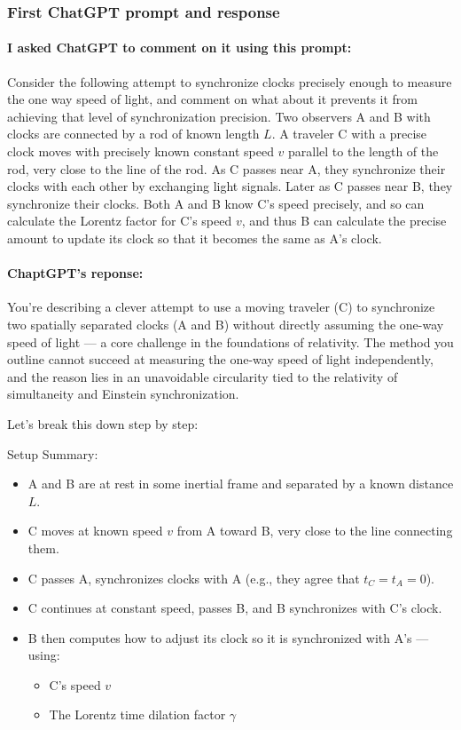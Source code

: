 \documentclass[a4paper]{article}
\theoremstyle{plain}
\theoremstyle{definition}
\begin{document}
\subsubsection{First ChatGPT prompt and response}

\paragraph{I asked ChatGPT to comment on it using this prompt:}

Consider the following attempt to synchronize clocks precisely enough
to measure the one way speed of light, and comment on what about it
prevents it from achieving that level of synchronization precision.
Two observers A and B with clocks are connected by a rod of known
length $L$.  A traveler C with a precise clock moves with precisely
known constant speed $v$ parallel to the length of the rod, very close
to the line of the rod.  As C passes near A, they synchronize their
clocks with each other by exchanging light signals.  Later as C passes
near B, they synchronize their clocks.  Both A and B know C's speed
precisely, and so can calculate the Lorentz factor for C's speed $v$,
and thus B can calculate the precise amount to update its clock so
that it becomes the same as A's clock.

\paragraph{ChaptGPT's reponse:}

You're describing a clever attempt to use a moving traveler (C) to
synchronize two spatially separated clocks (A and B) without directly
assuming the one-way speed of light — a core challenge in the
foundations of relativity.  The method you outline cannot succeed at
measuring the one-way speed of light independently, and the reason
lies in an unavoidable circularity tied to the relativity of
simultaneity and Einstein synchronization.

Let’s break this down step by step:

Setup Summary:

\begin{itemize}
\item A and B are at rest in some inertial frame and separated by a
  known distance $L$.
\item C moves at known speed $v$ from A toward B, very close to the
  line connecting them.
\item C passes A, synchronizes clocks with A (e.g., they agree that
  $t_C = t_A = 0$).
\item C continues at constant speed, passes B, and B synchronizes with
  C’s clock.
\item B then computes how to adjust its clock so it is synchronized
  with A’s — using:
  \begin{itemize}
    \item C’s speed $v$
    \item The Lorentz time dilation factor $\gamma$
  \end{itemize}
\end{itemize}
\end{document}
